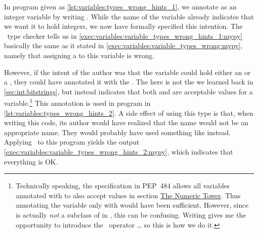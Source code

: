 In program  given as \cref{lst:variables:types_wrong_hints_1}, we annotate  as an integer variable by writing .
While the name of the variable already indicates that we want it to hold integers, we now have formally specified this intention.
The \mypy\ type checker tells us in \cref{exec:variables:variable_types_wrong_hints_1:mypy} basically the same as it stated in \cref{exec:variables:variable_types_wrong:mypy}, namely that assigning a  to this variable is wrong.

However, if the intent of the author was that the variable could hold either an  or a , they could have annotated it with the  .
The \pythonil{|} here is not the  we learned back in \cref{sec:int:bitstrings}, but instead indicates that both  and  are acceptable values for a variable.\footnote{%
Technically speaking, the  specification in PEP~484 allows all variables annotated with  to also accept  values in section \href{https://peps.python.org/pep-0484/\#the-numeric-tower}{The Numeric Tower}. %
Thus annotating the variable only with  would have been sufficient. %
However, since  is actually \emph{not} a subclass of  in \python, this can be confusing. %
Writing  gives me the opportunity to introduce the \pythonil{|}~operator {\dots} so this is how we do it.%
}
This annotation is used in program  in \cref{lst:variables:types_wrong_hints_2}.
A side effect of using this type is that, when writing this code, its author would have realized that the name  would not be an appropriate name.
They would probably have used something like  instead.
Applying \mypy\ to this program yields the output \cref{exec:variables:variable_types_wrong_hints_2:mypy}, which indicates that everything is OK.

